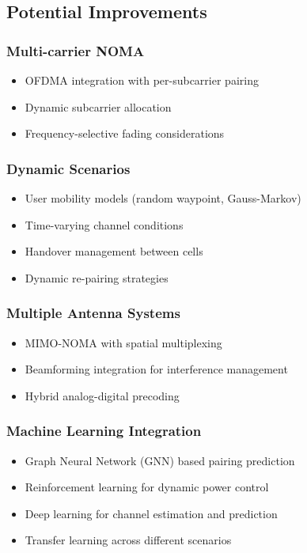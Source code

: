 \documentclass[12pt,a4paper]{article}
\begin{document}
\subsection{Potential Improvements}

\subsubsection{Multi-carrier NOMA}

\begin{itemize}
    \item OFDMA integration with per-subcarrier pairing
    \item Dynamic subcarrier allocation
    \item Frequency-selective fading considerations
\end{itemize}

\subsubsection{Dynamic Scenarios}

\begin{itemize}
    \item User mobility models (random waypoint, Gauss-Markov)
    \item Time-varying channel conditions
    \item Handover management between cells
    \item Dynamic re-pairing strategies
\end{itemize}

\subsubsection{Multiple Antenna Systems}

\begin{itemize}
    \item MIMO-NOMA with spatial multiplexing
    \item Beamforming integration for interference management
    \item Hybrid analog-digital precoding
\end{itemize}

\subsubsection{Machine Learning Integration}

\begin{itemize}
    \item Graph Neural Network (GNN) based pairing prediction
    \item Reinforcement learning for dynamic power control
    \item Deep learning for channel estimation and prediction
    \item Transfer learning across different scenarios
\end{itemize}
\end{document}
